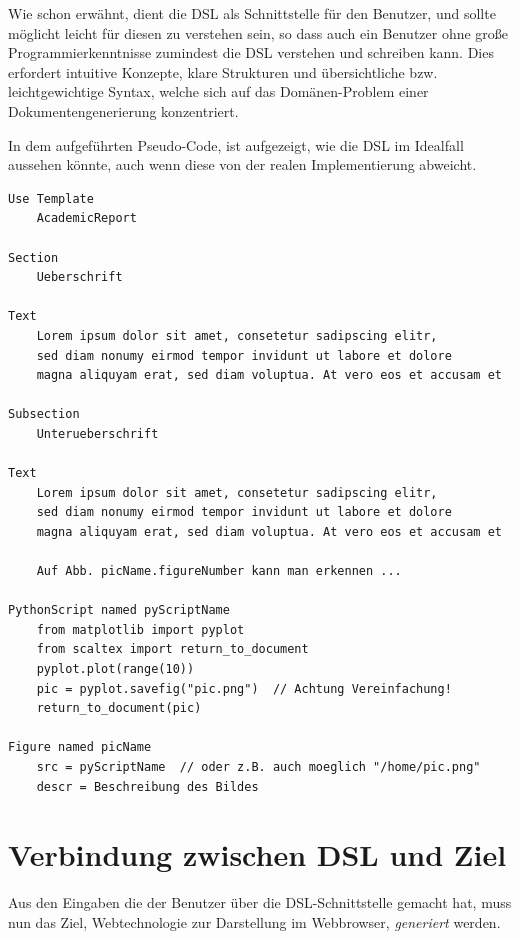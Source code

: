 Wie schon erwähnt, dient die DSL als Schnittstelle für den Benutzer,
und sollte möglicht leicht für diesen zu verstehen sein, so dass
auch ein Benutzer ohne große Programmierkenntnisse zumindest die
DSL verstehen und schreiben kann. Dies erfordert intuitive Konzepte,
klare Strukturen und übersichtliche bzw. leichtgewichtige Syntax, welche
sich auf das Domänen-Problem einer Dokumentengenerierung konzentriert.

In dem aufgeführten Pseudo-Code, ist aufgezeigt, wie die DSL im Idealfall
aussehen könnte, auch wenn diese von der realen Implementierung abweicht.

\begin{lstlisting}[language=DSL_ideal]
Use Template
    AcademicReport

Section
    Ueberschrift

Text
    Lorem ipsum dolor sit amet, consetetur sadipscing elitr,
    sed diam nonumy eirmod tempor invidunt ut labore et dolore
    magna aliquyam erat, sed diam voluptua. At vero eos et accusam et

Subsection
    Unterueberschrift

Text
    Lorem ipsum dolor sit amet, consetetur sadipscing elitr,
    sed diam nonumy eirmod tempor invidunt ut labore et dolore
    magna aliquyam erat, sed diam voluptua. At vero eos et accusam et

    Auf Abb. picName.figureNumber kann man erkennen ...

PythonScript named pyScriptName
    from matplotlib import pyplot
    from scaltex import return_to_document
    pyplot.plot(range(10))
    pic = pyplot.savefig("pic.png")  // Achtung Vereinfachung!
    return_to_document(pic)

Figure named picName
    src = pyScriptName  // oder z.B. auch moeglich "/home/pic.png"
    descr = Beschreibung des Bildes
\end{lstlisting}


\section{Verbindung zwischen DSL und Ziel}\label{sec-verbindung}

Aus den Eingaben die der Benutzer über die DSL-Schnittstelle gemacht hat,
muss nun das Ziel, Webtechnologie zur Darstellung im
Webbrowser, \emph{generiert} werden.

